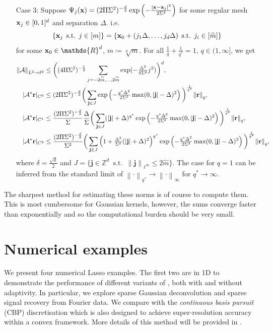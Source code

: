 \documentclass[10pt,a4paper,onecolumn]{article}
\numberwithin{equation}{section}
\let\F\mathds\let\C\mathcal\newcommand{\R}{\F{R}}\newcommand{\A}{\C{A}}
\newcommand{\norm}[1]{{\left\lVert #1 \right\rVert}}
\DeclareMathOperator{\st}{\;s.t.\;}\DeclareMathOperator{\as}{\;a.s.\;}\renewcommand{\epsilon}{\varepsilon}
\renewcommand{\vec}{\mathbf}
\newcommand{\UCmath}[1]{%
	\begingroup
	\ucmathlist\uppercase\expandafter{#1}%
	\endgroup
}
\newcommand{\ucmathlist}{%
	\def\alpha{\mathrm{A}}%
	\def\beta{\mathrm{B}}%
	\let\gamma=\Gamma
	\let\delta=\Delta
	\def\epsilon{\mathrm{E}}%
	\def\varepsilon{\mathrm{E}}%
	\def\zeta{\mathrm{Z}}%
	\def\eta{\mathrm{H}}%
	\let\theta=\Theta
	\let\vartheta=\Theta
	\def\iota{\mathrm{I}}%
	\def\kappa{\mathrm{K}}%
	\let\lambda=\Lambda
	\def\mu{\mathrm{M}}%
	\def\nu{\mathrm{N}}%
	\let\xi=\Xi
	\let\pi=\Pi
	\let\varpi=\Pi
	\def\rho{\mathrm{P}}%
	\def\varrho{\mathrm{P}}%
	\let\sigma=\Sigma
	\def\tau{\mathrm{T}}%
	\let\upsilon=\Upsilon
	\let\phi=\Phi
	\let\varphi=\Phi
	\def\chi{\mathrm{X}}%
	\let\psi=\Psi
	\let\omega=\Omega
}
\newcommand{\caps}[1]{\UCmath{#1}}
\newcommand*{\vard}[1]{%
	\IfEqCase{#1}{%
		{0}{\varphi}%
		{1}{\psi}%
	}[\varphi #1]%
}
\newcommand*{\varx}[1]{%
	\IfEqCase{#1}{%
		{0}{x}%
		{1}{y}%
		{2}{z}%
		{3}{r}%
	}[x#1]%
}
\newcommand*{\Varx}[1]{\caps{\varx{#1}}}
\newcommand*{\vvarx}[1]{\vec{\varx{#1}}}\newcommand*{\vVarx}[1]{\vec{\Varx{#1}}}
\begin{document}
\begin{theorem}
{\begin{enumerate}
			\item[Case 3:] Suppose $\vard1_j(\vvarx0) = (2\pi\sigma^2)^{-\frac{d}{2}}\exp\left(-\frac{|\vvarx0-\vvarx0_j|^2}{2\sigma^2}\right)$ for some regular mesh $\vvarx0_j\in[0,1]^d$ and separation $\Delta$. i.e. 
			$$\{\vvarx0_j\st j\in[m]\} = \{\vvarx0_0 + (j_1\Delta,\ldots,j_d\Delta)\st j_i\in[\hat m]\}$$
			for some $\vvarx0_0\in\R^d$, $\hat m\coloneqq\sqrt[d]{m}$. For all $\frac1q + \frac{1}{q^*} = 1$, $q\in(1,\infty]$, we get
			\begin{align}
				\norm{\A}_{L^2\to\ell^2} &\leq \bigg((4\pi\sigma^2)^{-\frac 12}\sum_{j=-2\hat m,\ldots,2\hat m}\exp(-\tfrac{\Delta^2}{4\sigma^2}j^2)\bigg)^d,
				\\ |\A^*\vvarx3|_{C^0} &\leq (2\pi\sigma^2)^{-\frac{d}{2}}\bigg(\sum_{\vec j\in J}\exp\left(-\tfrac{q^*\Delta^2}{2\sigma^2}\max(0,|\vec j|-\delta)^2\right)\bigg)^{\frac1{q^*}}\norm{\vvarx3}_q,
				\\ |\A^*\vvarx3|_{C^1} &\leq \frac{(2\pi\sigma^2)^{-\frac{d}{2}}}{\sigma}\frac{\Delta}{\sigma}\bigg(\sum_{\vec j\in J}(|\vec j|+\delta)^{q^*}\exp\left(-\tfrac{q^*\Delta^2}{2\sigma^2}\max(0,|\vec j|-\delta)^2\right)\bigg)^{\frac1{q^*}}\norm{\vvarx3}_q,
				\\ |\A^*\vvarx3|_{C^2} &\leq \frac{(2\pi\sigma^2)^{-\frac{d}{2}}}{\sigma^2} \bigg(\sum_{\vec j\in J} \left(1+\tfrac{\Delta^2}{\sigma^2}(|\vec j|+\delta)^2\right)^{q^*}\exp\left(-\tfrac{q^*\Delta^2}{2\sigma^2}\max(0,|\vec j|-\delta)^2\right)\bigg)^{\frac1{q^*}} \norm{\vvarx3}_q,
			\end{align}
			where $\delta= \frac{\sqrt d}{2}$ and $J=\{\vec j\in\F Z^d \st \norm{\vec j}_{\ell^\infty}\leq 2\hat m\}$. The case for $q=1$ can be inferred from the standard limit of $\norm\cdot_{{q^*}}\to \norm\cdot_{\infty}$ for $q^*\to\infty$.
		\end{enumerate}
	}
\end{theorem}

The sharpest method for estimating these norms is of course to compute them. This is most cumbersome for Gaussian kernels, however, the sums converge faster than exponentially and so the computational burden should be very small.


\section{Numerical examples}\label{sec: numerics}
We present four numerical Lasso examples. The first two are in 1D to demonstrate the performance of different variants of , both with and without adaptivity. In particular, we explore sparse Gaussian deconvolution and sparse signal recovery from Fourier data. We compare with the \emph{continuous basis pursuit} (CBP) discretisation \citep{Ekanadham2011, Duval2017b} which is also designed to achieve super-resolution accuracy within a convex framework. More details of this method will be provided in .
\end{document}

